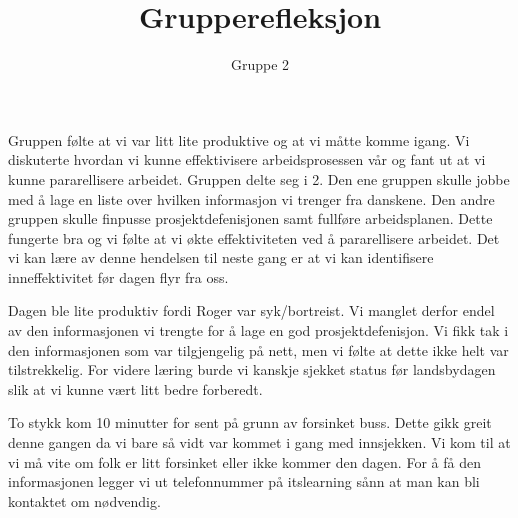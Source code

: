 \documentclass[11pt]{article} %
\title{Grupperefleksjon}
\author{Gruppe 2}
\begin{document}
\maketitle
Gruppen følte at vi var litt lite produktive og at vi måtte komme igang. 
Vi diskuterte hvordan vi kunne effektivisere arbeidsprosessen vår og fant ut at vi kunne pararellisere arbeidet.  Gruppen delte seg i 2. Den ene
gruppen skulle jobbe med å lage en liste over hvilken informasjon vi trenger fra
danskene. Den andre gruppen skulle finpusse prosjektdefenisjonen samt fullføre arbeidsplanen. 
Dette fungerte bra og vi følte at vi økte effektiviteten ved å pararellisere arbeidet. 
Det vi kan lære av denne hendelsen til neste gang er at vi kan identifisere inneffektivitet før dagen flyr fra oss.

Dagen ble lite produktiv fordi Roger var syk/bortreist. Vi manglet derfor endel av den informasjonen vi trengte for å lage en god prosjektdefenisjon. Vi fikk tak i den informasjonen som var tilgjengelig på nett, men vi følte at dette ikke helt var tilstrekkelig. For videre læring burde vi kanskje sjekket status før landsbydagen slik at vi kunne vært litt bedre forberedt. 

To stykk kom 10 minutter for sent på grunn av forsinket buss. Dette gikk greit denne gangen da vi bare så vidt var kommet i gang med innsjekken. Vi kom til at vi må vite om folk er litt forsinket eller ikke kommer den dagen. For å få den informasjonen legger vi ut telefonnummer på itslearning sånn at man kan bli kontaktet om nødvendig.
\end{document}
